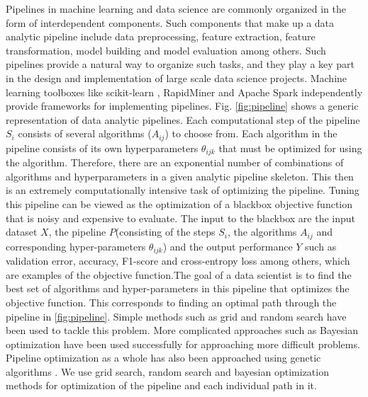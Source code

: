 Pipelines in machine learning and data science are commonly organized in the form of interdependent components. Such components that make up a data analytic pipeline include data preprocessing, feature extraction, feature transformation, model building and model evaluation among others. Such pipelines provide a natural way to organize such tasks, and they play a key part in the design and implementation of large scale data science projects. Machine learning toolboxes like scikit-learn \cite{pedregosa2011scikit}, RapidMiner \cite{mierswa2006yale} and Apache Spark \cite{spark2016apache} independently provide frameworks for implementing pipelines. Fig. \ref{fig:pipeline} shows a generic representation of data analytic pipelines. Each computational step of the pipeline $S_{i}$ consists of several algorithms ($A_{ij}$) to choose from. Each algorithm in the pipeline consists of its own hyperparameters $\theta_{ijk}$ that must be optimized for using the algorithm. Therefore, there are an exponential number of combinations of algorithms and hyperparameters in a given analytic pipeline skeleton. This then is an extremely computationally intensive task of optimizing the pipeline. Tuning this pipeline can be viewed as the optimization of a blackbox objective function that is noisy and expensive to evaluate. The input to the blackbox are the input dataset $X$, the pipeline $P$(consisting of the steps $S_{i}$, the algorithms $A_{ij}$ and corresponding hyper-parameters $\theta_{ijk}$) and the output performance $Y$ such as validation error, accuracy, F1-score and cross-entropy loss among others, which are examples of the objective function.The goal of a data scientist is to find the best set of algorithms and hyper-parameters in this pipeline that optimizes the objective function. This corresponds to finding an optimal path through the pipeline in \ref{fig:pipeline}.  Simple methods such as grid and random search \cite{bergstra2012random} have been used to tackle this problem. More complicated approaches such as Bayesian optimization \cite{snoek2012practical, zhang2016flash} have been used successfully for approaching more difficult problems. Pipeline optimization as a whole has also been approached using genetic algorithms \cite{olson2016evaluation, olson2016tpot, olson2016automating}.
We use grid search, random search and bayesian optimization methods for optimization of the pipeline and each individual path in it.  

